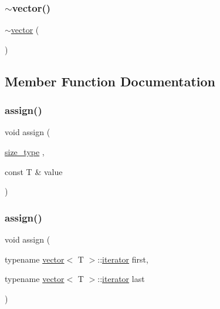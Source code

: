 \subsubsection{\texorpdfstring{$\sim$vector()}{~vector()}}
{\footnotesize\ttfamily $\sim$\mbox{\hyperlink{classvector}{vector}} (\begin{DoxyParamCaption}{ }\end{DoxyParamCaption})}



\subsection{Member Function Documentation}
\mbox{\label{classvector_a620ad2b2930c23100f218a4bc5e683d4}} 
\subsubsection{\texorpdfstring{assign()}{assign()}\hspace{0.1cm}{\footnotesize\ttfamily [1/3]}}
{\footnotesize\ttfamily void assign (\begin{DoxyParamCaption}\item[{\mbox{\hyperlink{classvector_ada51e68d31936547d3729c82daf6b7c6}{size\+\_\+type}}}]{,  }\item[{const T \&}]{value }\end{DoxyParamCaption})}

\mbox{\label{classvector_a835933c0800934df1c17b8d6edccb5b1}} 
\subsubsection{\texorpdfstring{assign()}{assign()}\hspace{0.1cm}{\footnotesize\ttfamily [2/3]}}
{\footnotesize\ttfamily void assign (\begin{DoxyParamCaption}\item[{typename \mbox{\hyperlink{classvector}{vector}}$<$ T $>$\+::\mbox{\hyperlink{classvector_a35c955cacac6aacaa1e82874b1628865}{iterator}}}]{first,  }\item[{typename \mbox{\hyperlink{classvector}{vector}}$<$ T $>$\+::\mbox{\hyperlink{classvector_a35c955cacac6aacaa1e82874b1628865}{iterator}}}]{last }\end{DoxyParamCaption})}

